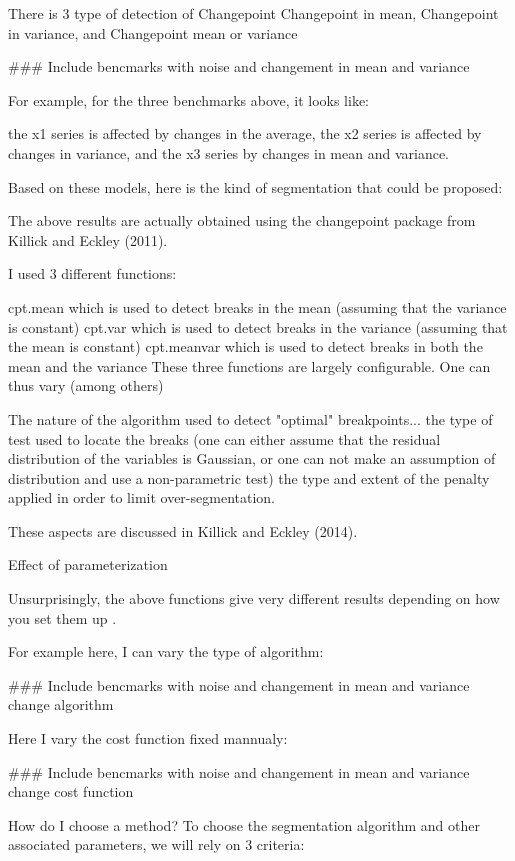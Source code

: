 \documentclass{article}
\begin{document}
There is 3 type of detection of Changepoint
Changepoint in mean, Changepoint in variance, and Changepoint mean or variance

\#\#\# Include bencmarks with noise and changement in mean and variance


For example, for the three benchmarks above, it looks like:

the x1 series is affected by changes in the average,
the x2 series is affected by changes in variance, and
the x3 series by changes in mean and variance.

Based on these models, here is the kind of segmentation that could be proposed:

The above results are actually obtained using the changepoint package from Killick and Eckley (2011).

I used 3 different functions:

cpt.mean which is used to detect breaks in the mean (assuming that the variance is constant)
cpt.var which is used to detect breaks in the variance (assuming that the mean is constant)
cpt.meanvar which is used to detect breaks in both the mean and the variance
These three functions are largely configurable. One can thus vary (among others)

The nature of the algorithm used to detect "optimal" breakpoints...
the type of test used to locate the breaks (one can either assume that the residual distribution of the variables is Gaussian, or one can not make an assumption of distribution and use a non-parametric test)
the type and extent of the penalty applied in order to limit over-segmentation.

These aspects are discussed in Killick and Eckley (2014).

Effect of parameterization

Unsurprisingly, the above functions give very different results depending on how you set them up .

For example here, I can vary the type of algorithm:

\#\#\# Include bencmarks with noise and changement in mean and variance change algorithm

Here I vary the cost function fixed mannualy:

\#\#\# Include bencmarks with noise and changement in mean and variance change cost function

How do I choose a method?
To choose the segmentation algorithm and other associated parameters, we will rely on 3 criteria:
\end{document}
